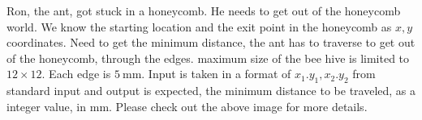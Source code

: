 {Ron, the ant, got stuck in a honeycomb. He needs to get out of the honeycomb world.}
{We know the starting location and the exit point in the honeycomb as $x,y$ coordinates. Need to get the minimum distance, the ant has to traverse to get out of the honeycomb, through the edges. maximum size of the bee hive is limited to $12\times 12$. Each edge is $5~\mbox{mm}$. Input is taken in a format of $x_1.y_1,x_2.y_2$ from standard input and output is expected, the minimum distance to be traveled, as a integer value, in $\mbox{mm}$. Please check out the above image for more details.}
{}
{}